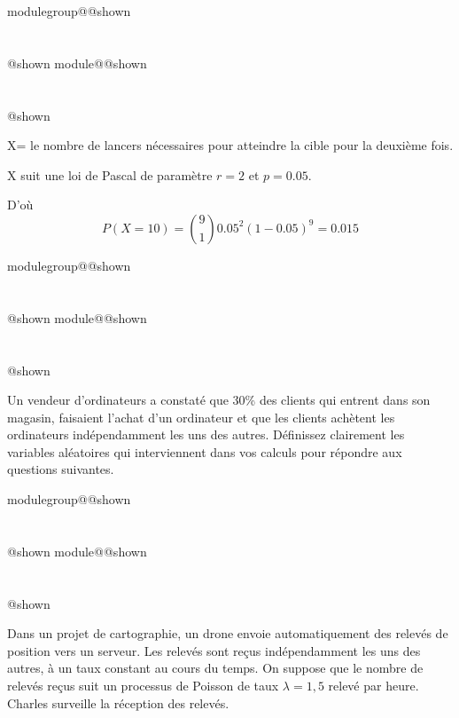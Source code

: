 \documentclass{Evaluation}
\makeatletter
\newcommand{\currentmodulekey}{}
\newcommand{\currentmoduletitle}{}
\newcommand{\currentgroupkey}{}
\newcommand{\currentgrouptitle}{}
\newcommand{\showmoduleifneeded}{%
  \ifx\currentgroupkey\empty\else
    \expandafter\ifx\csname modulegroup@\currentgroupkey @shown\endcsname\relax
      \section*{\currentgrouptitle}%
      \expandafter\gdef\csname modulegroup@\currentgroupkey @shown\endcsname{1}%
    \fi
  \fi
  \expandafter\ifx\csname module@\currentmodulekey @shown\endcsname\relax
    \section*{\currentmoduletitle}%
    \expandafter\gdef\csname module@\currentmodulekey @shown\endcsname{1}%
  \fi
}
\newenvironment{A24}{\showmoduleifneeded}{}
\newenvironment{H25}{\showmoduleifneeded}{}
\newenvironment{H26}{\showmoduleifneeded}{}
\makeatother
\begin{document}
\begin{questions}
\begin{A24}
\begin{parts}
\begin{solution}
    X= le nombre de lancers nécessaires pour atteindre la cible pour la deuxième fois.

    X suit une loi de Pascal de paramètre $r=2$ et $p=0.05$.

    D'où
    $$P(X=10)=\binom{9}{1}0.05^2(1-0.05)^9 = 0.015$$
\end{solution}

\end{parts}
\end{A24}

\begin{H25}
\question {} %
Un vendeur d’ordinateurs a constaté que 30\% des clients qui entrent dans son magasin, faisaient l’achat d’un ordinateur et que les clients achètent les ordinateurs indépendamment les uns des autres.
Définissez clairement les variables aléatoires qui interviennent dans vos calculs pour répondre aux questions suivantes.
\end{H25}

\begin{H26}
\question {} %

Dans un projet de cartographie, un drone envoie automatiquement des relevés de position vers un serveur. Les relevés sont reçus indépendamment les uns des autres, à un taux constant au cours du temps. On suppose que le nombre de relevés reçus suit un processus de Poisson de taux \(\lambda = 1{,}5\) relevé par heure. Charles surveille la réception des relevés.


\end{H26}
\end{questions}
\end{document}
